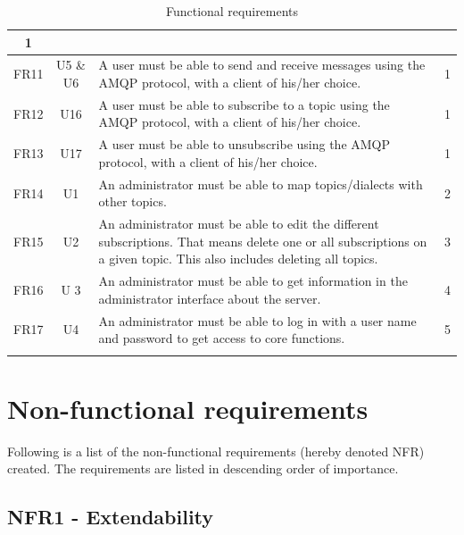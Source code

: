 \begin{longtable}{@{\extracolsep{\fill}}|l|l|p{8cm}|l|@{}}
\multicolumn{1}{c|}{1} \\ \hline
\multicolumn{1}{|c|}{FR11} & \multicolumn{1}{c|}{U5 \& U6} & A user must be able to send and receive messages using the AMQP protocol, with a client of his/her choice. &
\multicolumn{1}{c|}{1} \\ \hline
\multicolumn{1}{|c|}{FR12} & \multicolumn{1}{c|}{U16} & A user must be able to subscribe to a topic using the AMQP protocol, with a client of his/her choice. &
\multicolumn{1}{c|}{1} \\ \hline
\multicolumn{1}{|c|}{FR13} & \multicolumn{1}{c|}{U17} & A user must be able to unsubscribe using the AMQP protocol, with a client of his/her choice. &
\multicolumn{1}{c|}{1} \\ \hline
\multicolumn{1}{|c|}{FR14} & \multicolumn{1}{c|}{U1} & An administrator must be able to map topics/dialects with other topics. &
\multicolumn{1}{c|}{2} \\ \hline
\multicolumn{1}{|c|}{FR15} & \multicolumn{1}{c|}{U2} & An administrator must be able to edit the different subscriptions. That means delete one or all subscriptions on a given topic. This also includes deleting all topics. & \multicolumn{1}{c|}{3} \\ \hline
\multicolumn{1}{|c|}{FR16} & \multicolumn{1}{c|}{U  3} & An administrator must be able to get information in the administrator interface about the server. &  \multicolumn{1}{c|}{4} \\ \hline
\multicolumn{1}{|c|}{FR17} & \multicolumn{1}{c|}{U4} & An administrator must be able to log in with a user name and password to get access to core functions. & \multicolumn{1}{c|}{5} \\ \hline
\caption{Functional requirements}
\label{tab:func-requirements}
\end{longtable}

\clearpage

\section{Non-functional requirements}
\label{sec:requirements_engineering-non_functional_requirements}

Following is a list of the non-functional requirements (hereby denoted NFR) created. The requirements are listed in descending order of importance. 

\subsection{NFR1 - Extendability}
\label{subsec:requirements_engineering-non_functional_requirements-extendibility}

